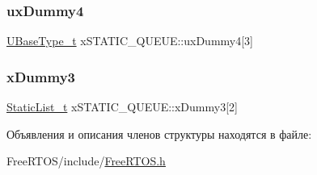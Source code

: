 \mbox{\label{structx_s_t_a_t_i_c___q_u_e_u_e_a502854697731754ce445f6503d14b127}} 
\subsubsection{\texorpdfstring{uxDummy4}{uxDummy4}}
{\footnotesize\ttfamily \mbox{\hyperlink{portmacro_8h_a646f89d4298e4f5afd522202b11cb2e6}{U\+Base\+Type\+\_\+t}} x\+S\+T\+A\+T\+I\+C\+\_\+\+Q\+U\+E\+U\+E\+::ux\+Dummy4\mbox{[}3\mbox{]}}

\mbox{\label{structx_s_t_a_t_i_c___q_u_e_u_e_add0de93e08b632124122850bcd543597}} 
\subsubsection{\texorpdfstring{xDummy3}{xDummy3}}
{\footnotesize\ttfamily \mbox{\hyperlink{_free_r_t_o_s_8h_a9735ad9101a2bd25f83a62089a4acee6}{Static\+List\+\_\+t}} x\+S\+T\+A\+T\+I\+C\+\_\+\+Q\+U\+E\+U\+E\+::x\+Dummy3\mbox{[}2\mbox{]}}



Объявления и описания членов структуры находятся в файле\+:\begin{DoxyCompactItemize}
\item 
Free\+R\+T\+O\+S/include/\mbox{\hyperlink{_free_r_t_o_s_8h}{Free\+R\+T\+O\+S.\+h}}\end{DoxyCompactItemize}
